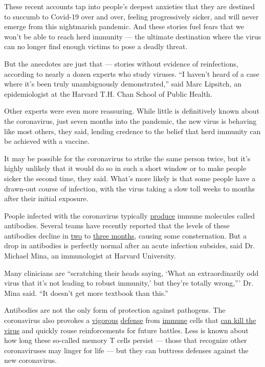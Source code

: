 These recent accounts tap into people's deepest anxieties that they are
destined to succumb to Covid-19 over and over, feeling progressively
sicker, and will never emerge from this nightmarish pandemic. And these
stories fuel fears that we won't be able to reach herd immunity --- the
ultimate destination where the virus can no longer find enough victims
to pose a deadly threat.

But the anecdotes are just that --- stories without evidence of
reinfections, according to nearly a dozen experts who study viruses. ``I
haven't heard of a case where it's been truly unambiguously
demonstrated,'' said Marc Lipsitch, an epidemiologist at the Harvard
T.H. Chan School of Public Health.

Other experts were even more reassuring. While little is definitively
known about the coronavirus, just seven months into the pandemic, the
new virus is behaving like most others, they said, lending credence to
the belief that herd immunity can be achieved with a vaccine.

It may be possible for the coronavirus to strike the same person twice,
but it's highly unlikely that it would do so in such a short window or
to make people sicker the second time, they said. What's more likely is
that some people have a drawn-out course of infection, with the virus
taking a slow toll weeks to months after their initial exposure.

People infected with the coronavirus typically
\href{https://www.nature.com/articles/s41586-020-2456-9}{produce} immune
molecules called antibodies. Several teams have recently reported that
the levels of these antibodies decline in
\href{https://www.medrxiv.org/content/10.1101/2020.07.09.20149633v1?\%253fcollection=}{two}
to \href{https://www.nature.com/articles/s41591-020-0965-6}{three
months}, causing some consternation. But a drop in antibodies is
perfectly normal after an acute infection subsides, said Dr. Michael
Mina, an immunologist at Harvard University.

Many clinicians are ``scratching their heads saying, `What an
extraordinarily odd virus that it's not leading to robust immunity,' but
they're totally wrong,''' Dr. Mina said. ``It doesn't get more textbook
than this.''

Antibodies are not the only form of protection against pathogens. The
coronavirus also provokes a
\href{https://www.biorxiv.org/content/10.1101/2020.06.29.174888v1}{vigorous}
\href{https://www.medrxiv.org/content/10.1101/2020.04.11.20062349v2?\%253fcollection=}{defense}
from
\href{https://www.medrxiv.org/content/10.1101/2020.05.13.20100636v1?\%253fcollection=}{immune}
cells that \href{https://pubmed.ncbi.nlm.nih.gov/32473127/}{can kill the
virus} and quickly rouse reinforcements for future battles. Less is
known about how long these so-called memory T cells persist --- those
that recognize other coronaviruses may linger for life --- but they can
buttress defenses against the new coronavirus.

